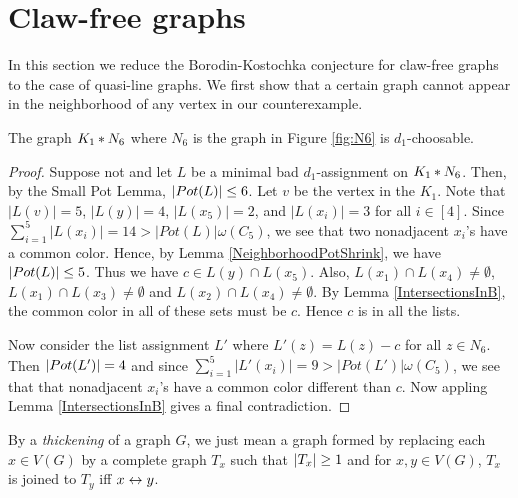 \section{Claw-free graphs}
In this section we reduce the Borodin-Kostochka conjecture for claw-free graphs
to the case of quasi-line graphs.  We first show that a certain graph cannot appear in the neighborhood of
any vertex in our counterexample.



\begin{lem}\label{N6Choosable}
The graph $K_1 \mbox{\hspace{2 pt}$\ast$\hspace{2 pt}} N_6$ where $N_6$ is the graph in Figure \ref{fig:N6} is
$d_1$-choosable.
\end{lem}
\begin{proof}
Suppose not and let $L$ be a minimal bad $d_1$-assignment on $K_1 \mbox{\hspace{2 pt}$\ast$\hspace{2 pt}} N_6$. 
Then, by the Small Pot Lemma, $\left|Pot(L)\right| \leq 6$.  Let $v$ be the vertex in
the $K_1$.  Note that $|L(v)|=5$, $|L(y)|=4$, $|L(x_5)|=2$, and $|L(x_i)|=3$ for
all $i\in[4]$.  Since $\sum_{i=1}^5|L(x_i)| = 14 > |Pot(L)|\omega(C_5)$, we see
that two nonadjacent $x_i$'s have a common color.  Hence, by Lemma
\ref{NeighborhoodPotShrink}, we have $\left|Pot(L)\right| \leq 5$. Thus we have $c
\in L(y) \cap L(x_5)$.  Also, $L(x_1) \cap L(x_4) \neq \emptyset$, $L(x_1) \cap
L(x_3) \neq \emptyset$ and $L(x_2) \cap L(x_4) \neq \emptyset$.  By Lemma
\ref{IntersectionsInB}, the common color in all of these sets must be $c$. 
Hence $c$ is in all the lists.

Now consider the list assignment $L'$ where $L'(z) = L(z) - c$ for all $z \in
N_6$.  Then $\left|Pot(L')\right| = 4$ and since $\sum_{i=1}^5|L'(x_i)| = 9 >
|Pot(L')|\omega(C_5)$, we see that that nonadjacent $x_i$'s have a common
color different than $c$.  Now appling Lemma \ref{IntersectionsInB} gives a
final contradiction.
\end{proof}

By a \emph{thickening} of a graph $G$, we just mean a graph formed by replacing
each $x \in V(G)$ by a complete graph $T_x$ such that $\left|T_x\right| \geq 1$ and
for $x,y \in V(G)$, $T_x$ is joined to $T_y$ iff $x \leftrightarrow y$.

